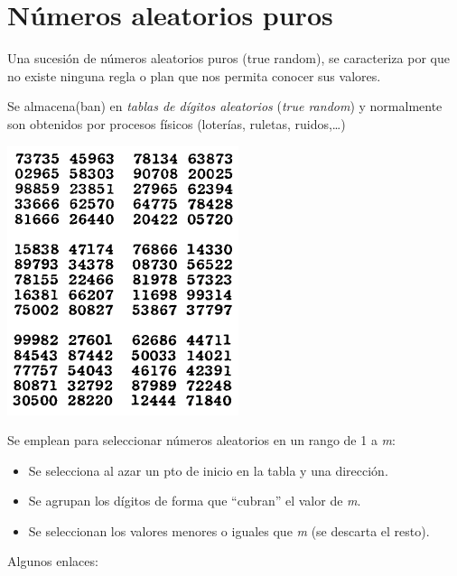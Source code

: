 \documentclass[]{book}
\theoremstyle{definition}
\theoremstyle{definition}
\theoremstyle{definition}
\theoremstyle{remark}
\begin{document}
\section{Números aleatorios puros}\label{numeros-aleatorios-puros}

Una sucesión de números aleatorios puros (true random), se caracteriza
por que no existe ninguna regla o plan que nos permita conocer sus
valores.

Se almacena(ban) en \emph{tablas de dígitos aleatorios} (\emph{true
random}) y normalmente son obtenidos por procesos físicos (loterías,
ruletas, ruidos,\ldots{})

\begin{center}\includegraphics[width=0.7\linewidth]{images/RAND} \end{center}

Se emplean para seleccionar números aleatorios en un rango de 1 a
\emph{m}:

\begin{itemize}
\item
  Se selecciona al azar un pto de inicio en la tabla y una dirección.
\item
  Se agrupan los dígitos de forma que ``cubran'' el valor de \emph{m}.
\item
  Se seleccionan los valores menores o iguales que \emph{m} (se descarta
  el resto).
\end{itemize}

Algunos enlaces:
\end{document}
